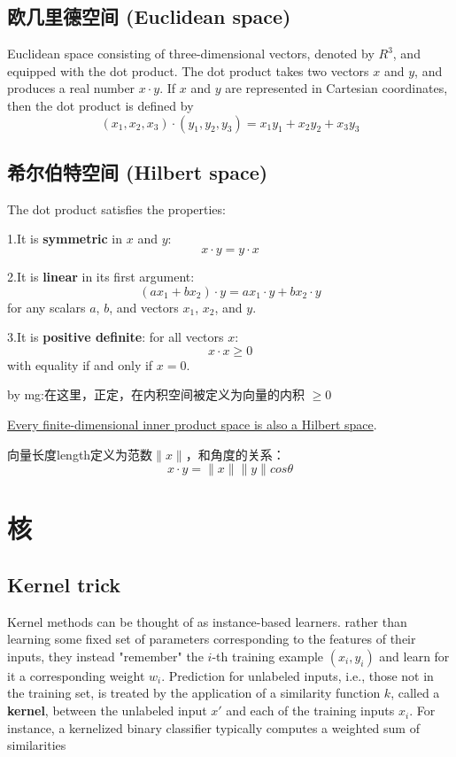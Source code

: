 \subsection{欧几里德空间 (Euclidean space)}
\cite{Hilbert space}
Euclidean space consisting of three-dimensional vectors, denoted by $R^3$, and equipped with the dot product. The dot product takes two vectors $x$ and $y$, and produces a real number $x \cdot y$. If $x$ and $y$ are represented in Cartesian coordinates, then the dot product is defined by
\[ \left( x_1,x_2,x_3\right) \cdot \left( y_1,y_2,y_3\right) = x_1 y_1 + x_2 y_2 + x_3 y_3 \]

\subsection{希尔伯特空间 (Hilbert space)}
\cite{Hilbert space}
The dot product satisfies the properties:\par
1.It is \textbf{symmetric} in $x$ and $y$: \[ x \cdot y = y \cdot x \] \par
2.It is \textbf{linear} in its first argument: 
\[ \left( ax_1 + bx_2 \right) \cdot y = ax_1 \cdot y + bx_2 \cdot y\]
for any scalars $a$, $b$, and vectors $x_1$, $x_2$, and $y$.\par
3.It is \textbf{positive definite}: for all vectors $x$:
\[ x \cdot x \geq 0 \] with equality if and only if $x = 0$.

by mg:在这里，正定，在内积空间被定义为向量的内积 $\geq 0$

\underline{Every finite-dimensional inner product space is also a Hilbert space}.\par
向量长度length定义为范数$\|x\|$，和角度的关系：
\[ x \cdot y = \|x \| \|y\| cos \theta\]


\section{核}
\subsection{Kernel trick}
\cite{Kernel trick}
Kernel methods can be thought of as instance-based learners. rather than learning some fixed set of parameters corresponding to the features of their inputs, they instead "remember" the $i$-th training example $\left(x_i,y_i \right)$ and learn for it a corresponding weight $w_i$. Prediction for unlabeled inputs, i.e., those not in the training set, is treated by the application of a similarity function $k$, called a \textbf{kernel}, between the unlabeled input $x'$ and each of the training inputs $x_i$. For instance, a kernelized binary classifier typically computes a weighted sum of similarities
